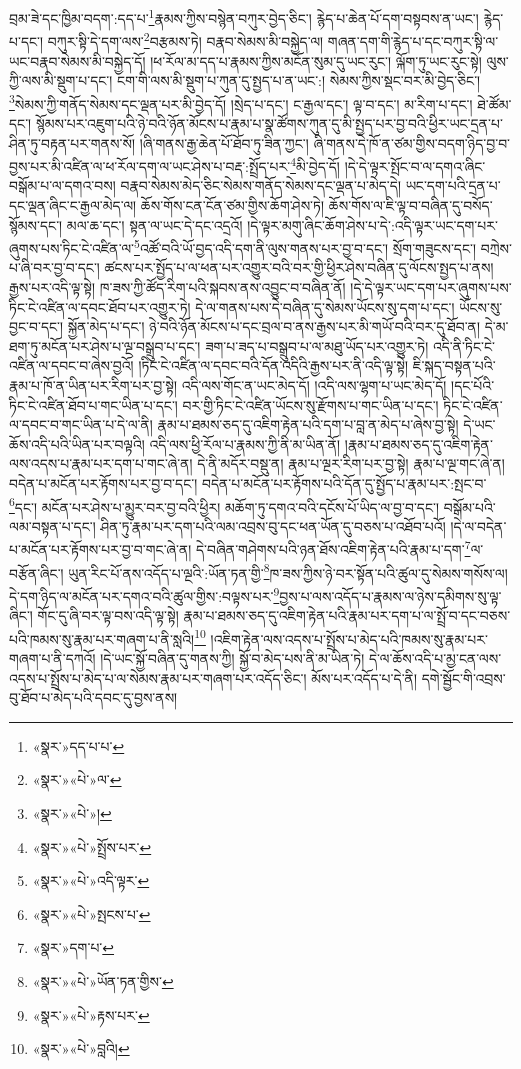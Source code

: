 བྲམ་ཟེ་དང་ཁྱིམ་བདག་:དད་པ་\footnote{«སྣར་»དད་པ་པ་}རྣམས་ཀྱིས་བསྙེན་བཀུར་བྱེད་ཅིང་། རྙེད་པ་ཆེན་པོ་དག་བསྟབས་ན་ཡང་། རྙེད་པ་དང་། བཀུར་སྟི་དེ་དག་ལས་\footnote{«སྣར་»«པེ་»ལ་}བརྩམས་ཏེ། བརྣབ་སེམས་མི་བསྐྱེད་ལ། གཞན་དག་གི་རྙེད་པ་དང་བཀུར་སྟི་ལ་ཡང་བརྣབ་སེམས་མི་བསྐྱེད་དོ། །ཕ་རོལ་མ་དད་པ་རྣམས་ཀྱིས་མངོན་སུམ་དུ་ཡང་རུང་། ལྐོག་ཏུ་ཡང་རུང་སྟེ། ལུས་ཀྱི་ལས་མི་སྡུག་པ་དང་། ངག་གི་ལས་མི་སྡུག་པ་ཀུན་དུ་སྤྱད་པ་ན་ཡང་:། སེམས་ཀྱིས་སྡང་བར་མི་བྱེད་ཅིང་། \footnote{«སྣར་»«པེ་»།  }སེམས་ཀྱི་གནོད་སེམས་དང་ལྡན་པར་མི་བྱེད་དོ། །སྲེད་པ་དང་། ང་རྒྱལ་དང་། ལྟ་བ་དང་། མ་རིག་པ་དང་། ཐེ་ཚོམ་དང་། སྙོམས་པར་འཇུག་པའི་ཉེ་བའི་ཉོན་མོངས་པ་རྣམ་པ་སྣ་ཚོགས་ཀུན་དུ་མི་སྤྱད་པར་བྱ་བའི་ཕྱིར་ཡང་དྲན་པ་ཤིན་ཏུ་བརྟན་པར་གནས་སོ། །ཞི་གནས་རྒྱ་ཆེན་པོ་ཐོབ་ཏུ་ཟིན་ཀྱང་། ཞི་གནས་དེ་ཁོ་ན་ཙམ་གྱིས་བདག་ཉིད་བྱ་བ་བྱས་པར་མི་འཛིན་ལ་ཕ་རོལ་དག་ལ་ཡང་ཤེས་པ་བརྡ་:སྤྲོད་པར་\footnote{«སྣར་»«པེ་»སྤྲོས་པར་}མི་བྱེད་དོ། །དེ་དེ་ལྟར་སྤོང་བ་ལ་དགའ་ཞིང་བསྒོམ་པ་ལ་དགའ་བས། བརྣབ་སེམས་མེད་ཅིང་སེམས་གནོད་སེམས་དང་ལྡན་པ་མེད་དེ། ཡང་དག་པའི་དྲན་པ་དང་ལྡན་ཞིང་ང་རྒྱལ་མེད་ལ། ཆོས་གོས་ངན་ངོན་ཙམ་གྱིས་ཆོག་ཤེས་ཏེ། ཆོས་གོས་ལ་ཇི་ལྟ་བ་བཞིན་དུ་བསོད་སྙོམས་དང་། མལ་ཆ་དང་། སྟན་ལ་ཡང་དེ་དང་འདྲའོ། །དེ་ལྟར་མགུ་ཞིང་ཆོག་ཤེས་པ་དེ་:འདི་ལྟར་ཡང་དག་པར་ཞུགས་པས་ཏིང་ངེ་འཛིན་ལ་\footnote{«སྣར་»«པེ་»འདི་ལྟར་}འཚོ་བའི་ཡོ་བྱད་འདི་དག་ནི་ལུས་གནས་པར་བྱ་བ་དང་། སྲོག་གཟུངས་དང་། བཀྲེས་པ་ཞི་བར་བྱ་བ་དང་། ཚངས་པར་སྤྱོད་པ་ལ་ཕན་པར་འགྱུར་བའི་བར་གྱི་ཕྱིར་ཤེས་བཞིན་དུ་ལོངས་སྤྱད་པ་ནས། རྒྱས་པར་འདི་ལྟ་སྟེ། ཁ་ཟས་ཀྱི་ཚོད་རིག་པའི་སྐབས་ནས་འབྱུང་བ་བཞིན་ནོ། །དེ་དེ་ལྟར་ཡང་དག་པར་ཞུགས་པས་ཏིང་ངེ་འཛིན་ལ་དབང་ཐོབ་པར་འགྱུར་ཏེ། དེ་ལ་གནས་པས་དེ་བཞིན་དུ་སེམས་ཡོངས་སུ་དག་པ་དང་། ཡོངས་སུ་བྱང་བ་དང་། སྐྱོན་མེད་པ་དང་། ཉེ་བའི་ཉོན་མོངས་པ་དང་བྲལ་བ་ནས་རྒྱས་པར་མི་གཡོ་བའི་བར་དུ་ཐོབ་ན། དེ་མ་ཐག་ཏུ་མངོན་པར་ཤེས་པ་ལྔ་བསྒྲུབ་པ་དང་། ཟག་པ་ཟད་པ་བསྒྲུབ་པ་ལ་མཐུ་ཡོད་པར་འགྱུར་ཏེ། འདི་ནི་ཏིང་ངེ་འཛིན་ལ་དབང་བ་ཞེས་བྱའོ། །ཏིང་ངེ་འཛིན་ལ་དབང་བའི་དོན་འདིའི་རྒྱས་པར་ནི་འདི་ལྟ་སྟེ། ཇི་སྐད་བསྟན་པའི་རྣམ་པ་ཁོ་ན་ཡིན་པར་རིག་པར་བྱ་སྟེ། འདི་ལས་གོང་ན་ཡང་མེད་དོ། །འདི་ལས་ལྷག་པ་ཡང་མེད་དོ། །དང་པོའི་ཏིང་ངེ་འཛིན་ཐོབ་པ་གང་ཡིན་པ་དང་། བར་གྱི་ཏིང་ངེ་འཛིན་ཡོངས་སུ་རྫོགས་པ་གང་ཡིན་པ་དང་། ཏིང་ངེ་འཛིན་ལ་དབང་བ་གང་ཡིན་པ་དེ་ལ་ནི། རྣམ་པ་ཐམས་ཅད་དུ་འཇིག་རྟེན་པའི་དག་པ་བླ་ན་མེད་པ་ཞེས་བྱ་སྟེ། དེ་ཡང་ཆོས་འདི་པའི་ཡིན་པར་བལྟའི། འདི་ལས་ཕྱི་རོལ་པ་རྣམས་ཀྱི་ནི་མ་ཡིན་ནོ། །རྣམ་པ་ཐམས་ཅད་དུ་འཇིག་རྟེན་ལས་འདས་པ་རྣམ་པར་དག་པ་གང་ཞེ་ན། དེ་ནི་མདོར་བསྡུ་ན། རྣམ་པ་ལྔར་རིག་པར་བྱ་སྟེ། རྣམ་པ་ལྔ་གང་ཞེ་ན། བདེན་པ་མངོན་པར་རྟོགས་པར་བྱ་བ་དང་། བདེན་པ་མངོན་པར་རྟོགས་པའི་དོན་དུ་སྤྱོད་པ་རྣམ་པར་:སྤང་བ་\footnote{«སྣར་»«པེ་»སྤངས་པ་}དང་། མངོན་པར་ཤེས་པ་མྱུར་བར་བྱ་བའི་ཕྱིར། མཆོག་ཏུ་དགའ་བའི་དངོས་པོ་ཡིད་ལ་བྱ་བ་དང་། བསྒོམ་པའི་ལམ་བསྟན་པ་དང་། ཤིན་ཏུ་རྣམ་པར་དག་པའི་ལམ་འབྲས་བུ་དང་ཕན་ཡོན་དུ་བཅས་པ་འཐོབ་པའོ། །དེ་ལ་བདེན་པ་མངོན་པར་རྟོགས་པར་བྱ་བ་གང་ཞེ་ན། དེ་བཞིན་གཤེགས་པའི་ཉན་ཐོས་འཇིག་རྟེན་པའི་རྣམ་པ་དག་\footnote{«སྣར་»དག་པ་}ལ་བརྩོན་ཞིང་། ཡུན་རིང་པོ་ནས་འདོད་པ་ལྔའི་:ཡོན་ཏན་གྱི་\footnote{«སྣར་»«པེ་»ཡོན་ཏན་གྱིས་}ཁ་ཟས་ཀྱིས་ཉེ་བར་སྟོན་པའི་ཚུལ་དུ་སེམས་གསོས་ལ། དེ་དག་ཉིད་ལ་མངོན་པར་དགའ་བའི་ཚུལ་གྱིས་:བལྟས་པར་\footnote{«སྣར་»«པེ་»རྟས་པར་}བྱས་པ་ལས་འདོད་པ་རྣམས་ལ་ཉེས་དམིགས་སུ་ལྟ་ཞིང་། གོང་དུ་ཞི་བར་ལྟ་བས་འདི་ལྟ་སྟེ། རྣམ་པ་ཐམས་ཅད་དུ་འཇིག་རྟེན་པའི་རྣམ་པར་དག་པ་ལ་སྤྲོ་བ་དང་བཅས་པའི་ཁམས་སུ་རྣམ་པར་གཞག་པ་ནི་སླའི།\footnote{«སྣར་»«པེ་»བླའི།} །འཇིག་རྟེན་ལས་འདས་པ་སྤྲོས་པ་མེད་པའི་ཁམས་སུ་རྣམ་པར་གཞག་པ་ནི་དཀའོ། །དེ་ཡང་སྐྱོ་བཞིན་དུ་གནས་ཀྱི། སྐྱོ་བ་མེད་པས་ནི་མ་ཡིན་ཏེ། དེ་ལ་ཆོས་འདི་པ་མྱ་ངན་ལས་འདས་པ་སྤྲོས་པ་མེད་པ་ལ་སེམས་རྣམ་པར་གཞག་པར་འདོད་ཅིང་། མོས་པར་འདོད་པ་དེ་ནི། དགེ་སྦྱོང་གི་འབྲས་བུ་ཐོབ་པ་མེད་པའི་དབང་དུ་བྱས་ནས། 